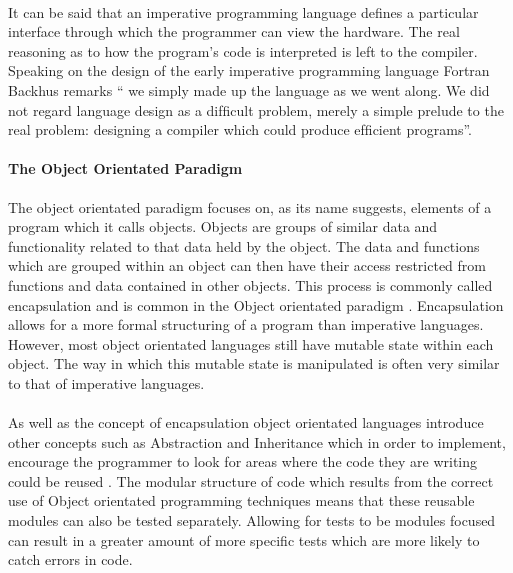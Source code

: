 \documentclass[main.tex]{subfiles}
\begin{document}
\paragraph{} It can be said that an imperative programming language defines a particular interface through which the programmer can view the hardware. The real reasoning as to how the program's code is interpreted is left to the compiler. Speaking on the design of the early imperative programming language Fortran Backhus remarks `` we simply made up the language as we went along. We did not regard language design as a difﬁcult problem, merely a simple prelude to the real problem: designing a compiler which could produce efﬁcient programs''\cite{Backus1998}.

\paragraph{The Object Orientated Paradigm}
The object orientated paradigm focuses on, as its name suggests, elements of a program which it calls objects. Objects are groups of similar data and functionality related to that data held by the object. The data and functions which are grouped within an object can then have their access restricted from functions and data contained in other objects. This process is commonly called encapsulation and is common in the Object orientated paradigm \cite{DavidJ.Barnes2008}. Encapsulation allows for a more formal structuring of a program than imperative languages. However, most object orientated languages still have mutable state within each object. The way in which this mutable state is manipulated is often very similar to that of imperative languages\cite{Aaby1996}.

\paragraph{}As well as the concept of encapsulation object orientated languages introduce other concepts such as Abstraction and Inheritance which in order to implement, encourage the programmer to look for areas where the code they are writing could be reused \cite{DavidJ.Barnes2008}. The modular structure of code which results from the correct use of Object orientated programming techniques means that these reusable modules can also be tested separately. Allowing for tests to be modules focused can result in a greater amount of more specific tests which are more likely to catch errors in code.
\end{document}
